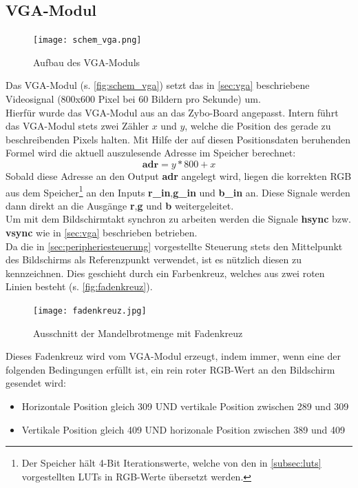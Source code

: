 \documentclass[a4paper,12pt,onesided]{report}
\begin{document}
\subsection{VGA-Modul}
\label{subsec:vga-modul}
\begin{figure}[H]
	\centering
	\texttt{[image: schem\_vga.png]}
	\caption{Aufbau des VGA-Moduls}
	\label{fig:schem_vga}
\end{figure}
Das VGA-Modul (s. \autoref{fig:schem_vga}) setzt das in \autoref{sec:vga} beschriebene Videosignal (800x600 Pixel bei 60 Bildern pro Sekunde) um.\\
Hierfür wurde das VGA-Modul aus \cite{vgagit} an das Zybo-Board angepasst.
Intern führt das VGA-Modul stets zwei Zähler $x$ und $y$, welche die Position des gerade zu beschreibenden Pixels halten.
Mit Hilfe der auf diesen Positionsdaten beruhenden Formel wird die aktuell auszulesende Adresse im Speicher berechnet:
\[\mathbf{adr}= y*800+ x\]
Sobald diese Adresse an den Output \textbf{adr} angelegt wird, liegen die korrekten RGB aus dem Speicher\footnote{Der Speicher hält 4-Bit Iterationswerte, welche von den in \autoref{subsec:luts} vorgestellten LUTs in RGB-Werte übersetzt werden.} an den Inputs \textbf{r\_in},\textbf{g\_in} und \textbf{b\_in} an.
Diese Signale werden dann direkt an die Ausgänge \textbf{r},\textbf{g} und \textbf{b} weitergeleitet.\\
Um mit dem Bildschirmtakt synchron zu arbeiten werden die Signale \textbf{hsync} bzw. \textbf{vsync} wie in \autoref{sec:vga} beschrieben betrieben.\\
Da die in \autoref{sec:peripheriesteuerung} vorgestellte Steuerung stets den Mittelpunkt des Bildschirms als Referenzpunkt verwendet, ist es nützlich diesen zu kennzeichnen.
Dies geschieht durch ein Farbenkreuz, welches aus zwei roten Linien besteht (s. \autoref{fig:fadenkreuz}).
\begin{figure}[H]
	\centering
	\texttt{[image: fadenkreuz.jpg]}
	\caption{Ausschnitt der Mandelbrotmenge mit Fadenkreuz}
	\label{fig:fadenkreuz}
\end{figure}
Dieses Fadenkreuz wird vom VGA-Modul erzeugt, indem immer, wenn eine der folgenden Bedingungen erfüllt ist, ein rein roter RGB-Wert an den Bildschirm gesendet wird:
\begin{itemize}
	\item Horizontale Position gleich 309 UND vertikale Position zwischen 289 und 309
	\item Vertikale Position gleich 409 UND horizonale Position zwischen 389 und 409
\end{itemize}
\end{document}
